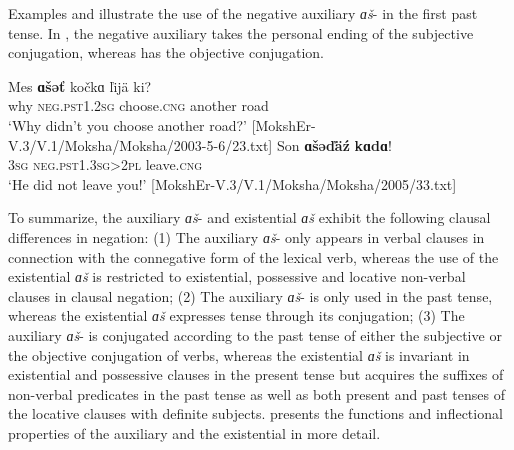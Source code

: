 \documentclass[output=paper]{langsci/langscibook}
\begin{document}
  Examples  and  illustrate the use of the negative auxiliary \textit{ɑš}- in the first past tense. In , the negative auxiliary takes the personal ending of the subjective conjugation, whereas  has the objective conjugation.

\ea\label{ex:moksha-road}
\gll Mes \textbf{ɑšəť} kočkɑ ľijä ki?\\
why \textsc{neg.pst1.2sg} choose.\textsc{cng} another road\\
\glt `Why didn't you choose another road?' [MokshEr-V.3/V.1/Moksha/Moksha/2003-5-6/23.txt]
\z
\ea\label{ex:moksha-leave}
\gll Son \textbf{ɑšəďäź} \textbf{kɑdɑ}!\\
\textsc{3sg} \textsc{neg.pst1.3sg>2pl} leave.\textsc{cng}\\
\glt `He did not leave you!' [MokshEr-V.3/V.1/Moksha/Moksha/2005/33.txt]
\z

  To summarize, the auxiliary \textit{ɑš}- and existential \textit{ɑš} exhibit the following clausal differences in negation: (1) The auxiliary \textit{ɑš}- only appears in verbal clauses in connection with the connegative form of the lexical verb, whereas the use of the existential \textit{ɑš} is restricted to existential, possessive and locative non-verbal clauses in clausal negation; (2) The auxiliary \textit{ɑš}- is only used in the past tense, whereas the existential \textit{ɑš} expresses tense through its conjugation; (3) The auxiliary \textit{ɑš}- is conjugated according to the past tense of either the subjective or the objective conjugation of verbs, whereas the existential \textit{ɑš} is invariant in existential and possessive clauses in the present tense but acquires the suffixes of non-verbal predicates in the past tense as well as both present and past tenses of the locative clauses with definite subjects.  presents the functions and inflectional properties of the auxiliary and the existential in more detail.
\end{document}
